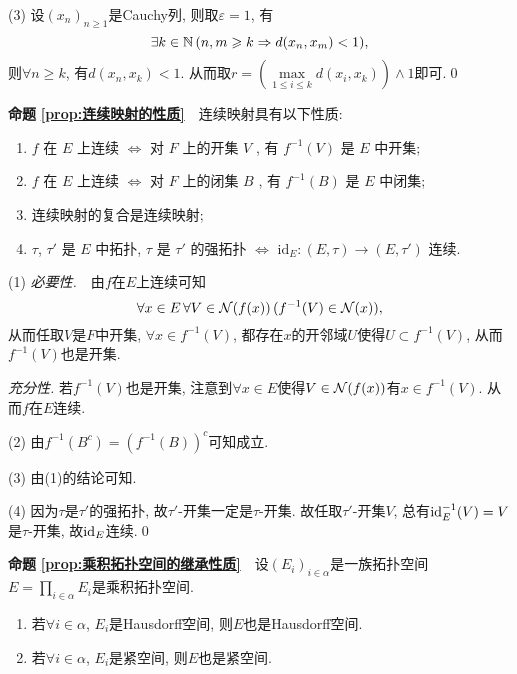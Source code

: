 \begin{appendix}
\begin{Proof}
	(3) 设$ (x_n)_{n\geqslant 1} $是Cauchy列, 则取$ \varepsilon=1 $, 有
	\[
	\exists k\in\mathbb{N}\,(n,m\geqslant k\Rightarrow d(x_n,x_m)<1),
	\]
	则$ \forall n\geqslant k $, 有$ d(x_n,x_k)<1 $. 从而取$ r=\left(\max\limits_{1\leqslant i\leqslant k}d(x_i,x_k)\right)\land 1 $即可.\qed
	\end{Proof}
	
	\textbf{命题\,\,\ref{prop:连续映射的性质}}\ \ 连续映射具有以下性质:
		\begin{enumerate}[(1)]
	    \item $ f $ 在 $ E $ 上连续 $ \Longleftrightarrow $ 对 $ F $ 上的开集 $ V $ , 有 $ f^{-1}(V) $ 是 $ E $ 中开集;
	    \item $ f $ 在 $ E $ 上连续 $ \Longleftrightarrow $ 对 $ F $ 上的闭集 $ B $ , 有 $ f^{-1}(B) $ 是 $ E $ 中闭集;
	    \item 连续映射的复合是连续映射;
	    \item $ \tau $, $ \tau' $ 是 $ E $ 中拓扑,  $ \tau $ 是 $ \tau' $ 的强拓扑 $ \Longleftrightarrow $ $ \mathrm{id}_{E}:(E, \tau)\to(E, \tau') $ 连续. 
		\end{enumerate}
	\begin{Proof}
	(1) \textsl{必要性.}\ \ 由$ f $在$ E $上连续可知
	\[
	\forall x\in E\,\forall V\in\mathcal{N}(f(x))\,(f^{-1}(V)\in\mathcal{N}(x)),
	\]
	从而任取$ V $是$ F $中开集, $ \forall x\in f^{-1}(V) $, 都存在$ x $的开邻域$ U $使得$ U\subset f^{-1}(V) $, 从而$ f^{-1}(V) $也是开集.
	
	\textsl{充分性.} 若$ f^{-1}(V) $也是开集, 注意到$ \forall x\in E $使得$ V\in\mathcal{N}(f(x)) $有$ x\in f^{-1}(V) $. 从而$ f $在$ E $连续.
	
	(2) 由$ f^{-1}(B^c)=(f^{-1}(B))^c $可知成立.
	
	(3) 由(1)的结论可知.
	
	(4) 因为$ \tau $是$ \tau' $的强拓扑, 故$ \tau' $-开集一定是$ \tau $-开集. 故任取$ \tau' $-开集$ V $, 总有$ \mathrm{id}_E^{-1}(V)=V $是$ \tau $-开集, 故$ \mathrm{id}_E $连续.\qed
	\end{Proof}
	
	\textbf{命题\,\,\ref{prop:乘积拓扑空间的继承性质}}\ \ 设$ (E_i)_{i\in\alpha} $是一族拓扑空间 $ E=\prod\limits_{i\in\alpha}E_i $是乘积拓扑空间.
		\begin{enumerate}[(1)]
		\item 若$ \forall i\in\alpha $, $ E_i $是Hausdorff空间, 则$ E $也是Hausdorff空间.
		
		\item 若$ \forall i\in\alpha $, $ E_i $是紧空间, 则$ E $也是紧空间.
		

\end{enumerate}
\end{appendix}
